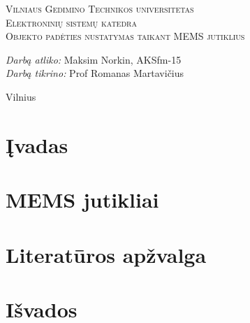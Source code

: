 \documentclass[11pt, a4paper]{article}
\begin{document}
  \begin{titlepage}
    \begin{center}
      \textsc{\LARGE Vilniaus Gedimino Technikos universitetas}\\[2mm]
      \textsc{\Large Elektroninių sistemų katedra}\\[70mm]
      \textsc{\Large Objekto padėties nustatymas taikant MEMS jutiklius}\\[60mm]
      \begin{minipage}{1\textwidth}
      \begin{flushright}
        \emph{Darbą atliko:} Maksim Norkin, AKSfm-15\\ 
        \emph{Darbą tikrino:} Prof Romanas Martavičius\\
      \end{flushright}
    \end{minipage}
      \vfill
      {\large Vilnius \\ \the\year}
    \end{center}
  \end{titlepage}

  \tableofcontents

  \newpage

  \section{Įvadas}

  

  \section{MEMS jutikliai}

  

  \section{Literatūros apžvalga}

  

  \section{Išvados}

  

  \newpage

  
  
\end{document}
